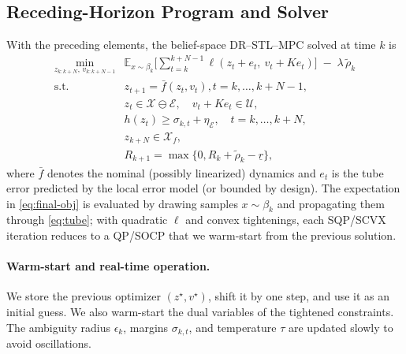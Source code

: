 \documentclass[journal]{IEEEtran}
\theoremstyle{definition}
\begin{document}
\subsection{Receding-Horizon Program and Solver}
\label{subsec:program}
With the preceding elements, the belief-space DR--STL--MPC solved at time $k$ is
\begin{subequations}
\label{eq:final-mpc}
\begin{align}
\min_{z_{k:k+N},\,v_{k:k+N-1}}   &
\mathbb{E}_{x\sim\beta_k}\!\Big[\sum_{t=k}^{k+N-1}\ell(z_t+e_t,\ v_t+K e_t)\Big]
\;-\;\lambda\,\widetilde{\rho}_k
\label{eq:final-obj}\\
\text{s.t.}\quad
& z_{t+1} = \bar{f}(z_t,v_t),  t=k,\dots,k+N-1, \label{eq:final-nomdyn}\\
& z_t \in \mathcal{X}\ominus\mathcal{E},\quad v_t+K e_t\in \mathcal{U}, \label{eq:final-bounds}\\
& h(z_t) \ge \sigma_{k,t} + \eta_{\mathcal{E}}, \quad t=k,\dots,k+N, \label{eq:final-safety}\\
& z_{k+N}\in\mathcal{X}_f,\label{eq:final-terminal}\\
&R_{k+1}=\max\{0, R_k + \widetilde{\rho}_k - \underline{r}\}, 
\end{align}
\end{subequations}
where $\bar{f}$ denotes the nominal (possibly linearized) dynamics and $e_t$ is the tube error predicted
by the local error model (or bounded by design). The expectation in \eqref{eq:final-obj} is evaluated by
drawing samples $x\sim\beta_k$ and propagating them through \eqref{eq:tube}; with quadratic $\ell$ and convex
tightenings, each SQP/SCVX iteration reduces to a QP/SOCP that we warm-start from the previous solution.

\paragraph*{Warm-start and real-time operation.}
We store the previous optimizer $(z^\star,v^\star)$, shift it by one step, and use it as an initial guess.
We also warm-start the dual variables of the tightened constraints. The ambiguity radius $\epsilon_k$, margins
$\sigma_{k,t}$, and temperature $\tau$ are updated slowly to avoid oscillations.
\end{document}
